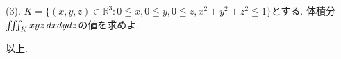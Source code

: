 \documentclass[dvipdfmx,a4paper,11pt]{article}
\newcommand{\R}{\mathbb{R}}
\theoremstyle{definition}
\newcommand{\pdrv}[2]{\frac{\partial #1}{\partial #2}}
\begin{document}


\vspace{11pt}
{\large(3). $K=\{ (x,y,z) \in \R^3 : 0 \leqq x, 0 \leqq y, 0 \leqq z, x^2+y^2+z^2 \leqq 1\}$とする.
体積分$\iiint_{K} xyz \text{\,}dxdydz$の値を求めよ.}


     \vspace{33pt} 
     
 \begin{flushright}
 {\LARGE 以上.}
 \end{flushright}




  

 
\end{document}
